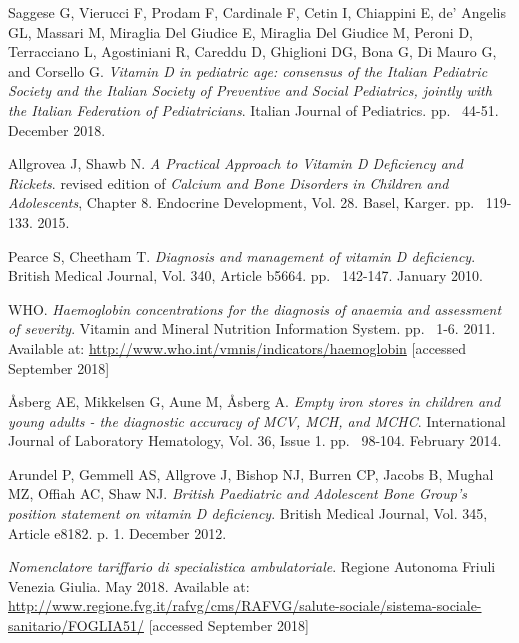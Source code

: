 \begin{thebibliography}{50}
  Saggese G, Vierucci F, Prodam F, Cardinale F, Cetin I, Chiappini E, de’ Angelis GL, Massari M, Miraglia Del Giudice E, Miraglia Del Giudice M, Peroni D, Terracciano L, Agostiniani R, Careddu D, Ghiglioni DG, Bona G, Di Mauro G, and Corsello G.
  \textit{Vitamin D in pediatric age: consensus of the Italian Pediatric Society and the Italian Society of Preventive and Social Pediatrics, jointly with the Italian Federation of Pediatricians}.
  Italian Journal of Pediatrics.
  pp. ~44-51.
  December 2018.
  
  Allgrovea J, Shawb N.
  \textit{A Practical Approach to Vitamin D Deficiency and Rickets}.
   revised edition of \textit{Calcium and Bone Disorders in Children and Adolescents}, Chapter 8.
  Endocrine Development, Vol. 28.
  Basel, Karger.
  pp. ~119-133.
  2015.
  
  Pearce S, Cheetham T.
  \textit{Diagnosis and management of vitamin D deficiency}.
  British Medical Journal, Vol. 340, Article b5664.
  pp. ~142-147.
  January 2010.
  
  WHO.
  \textit{Haemoglobin concentrations for the diagnosis of anaemia and assessment of severity}.
  Vitamin and Mineral Nutrition Information System.
  pp. ~1-6.
  2011.
  Available at: \url{http://www.who.int/vmnis/indicators/haemoglobin} [accessed September 2018]
  
  Åsberg AE, Mikkelsen G, Aune M, Åsberg A.
  \textit{Empty iron stores in children and young adults - the diagnostic accuracy of MCV, MCH, and MCHC}.
  International Journal of Laboratory Hematology, Vol. 36, Issue 1.
  pp. ~98-104.
  February 2014.
  
  Arundel P, Gemmell AS, Allgrove J, Bishop NJ, Burren CP, Jacobs B, Mughal MZ, Offiah AC, Shaw NJ.
  \textit{British Paediatric and Adolescent Bone Group’s position statement on vitamin D deficiency}.
  British Medical Journal, Vol. 345, Article e8182.
  p. 1.
  December 2012.
  
  \textit{Nomenclatore tariffario di specialistica ambulatoriale}.
  Regione Autonoma Friuli Venezia Giulia.
  May 2018.
  Available at: \url{http://www.regione.fvg.it/rafvg/cms/RAFVG/salute-sociale/sistema-sociale-sanitario/FOGLIA51/} [accessed September 2018]

\end{thebibliography}